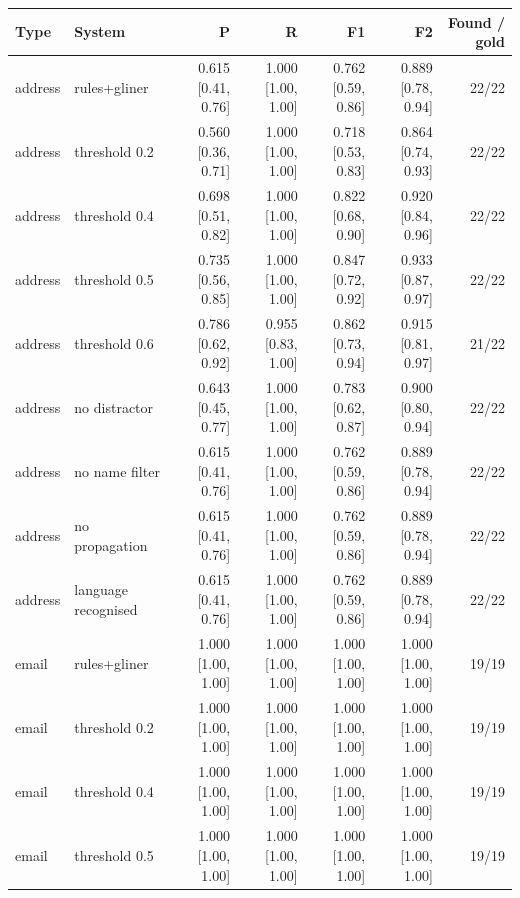 \providecommand{\ci}[2]{{\scriptsize [#1, #2]}}

\begin{table}[htbp]
\centering
\small
\begin{tabular}{llrrrrr}
\toprule
Type & System & P & R & F1 & F2 & Found / gold \\
\midrule
address & rules+gliner & 0.615 \ci{0.41}{0.76} & 1.000 \ci{1.00}{1.00} & 0.762 \ci{0.59}{0.86} & 0.889 \ci{0.78}{0.94} & 22/22 \\
address & threshold 0.2 & 0.560 \ci{0.36}{0.71} & 1.000 \ci{1.00}{1.00} & 0.718 \ci{0.53}{0.83} & 0.864 \ci{0.74}{0.93} & 22/22 \\
address & threshold 0.4 & 0.698 \ci{0.51}{0.82} & 1.000 \ci{1.00}{1.00} & 0.822 \ci{0.68}{0.90} & 0.920 \ci{0.84}{0.96} & 22/22 \\
address & threshold 0.5 & 0.735 \ci{0.56}{0.85} & 1.000 \ci{1.00}{1.00} & 0.847 \ci{0.72}{0.92} & 0.933 \ci{0.87}{0.97} & 22/22 \\
address & threshold 0.6 & 0.786 \ci{0.62}{0.92} & 0.955 \ci{0.83}{1.00} & 0.862 \ci{0.73}{0.94} & 0.915 \ci{0.81}{0.97} & 21/22 \\
address & no distractor & 0.643 \ci{0.45}{0.77} & 1.000 \ci{1.00}{1.00} & 0.783 \ci{0.62}{0.87} & 0.900 \ci{0.80}{0.94} & 22/22 \\
address & no name filter & 0.615 \ci{0.41}{0.76} & 1.000 \ci{1.00}{1.00} & 0.762 \ci{0.59}{0.86} & 0.889 \ci{0.78}{0.94} & 22/22 \\
address & no propagation & 0.615 \ci{0.41}{0.76} & 1.000 \ci{1.00}{1.00} & 0.762 \ci{0.59}{0.86} & 0.889 \ci{0.78}{0.94} & 22/22 \\
address & language recognised & 0.615 \ci{0.41}{0.76} & 1.000 \ci{1.00}{1.00} & 0.762 \ci{0.59}{0.86} & 0.889 \ci{0.78}{0.94} & 22/22 \\
email & rules+gliner & 1.000 \ci{1.00}{1.00} & 1.000 \ci{1.00}{1.00} & 1.000 \ci{1.00}{1.00} & 1.000 \ci{1.00}{1.00} & 19/19 \\
email & threshold 0.2 & 1.000 \ci{1.00}{1.00} & 1.000 \ci{1.00}{1.00} & 1.000 \ci{1.00}{1.00} & 1.000 \ci{1.00}{1.00} & 19/19 \\
email & threshold 0.4 & 1.000 \ci{1.00}{1.00} & 1.000 \ci{1.00}{1.00} & 1.000 \ci{1.00}{1.00} & 1.000 \ci{1.00}{1.00} & 19/19 \\
email & threshold 0.5 & 1.000 \ci{1.00}{1.00} & 1.000 \ci{1.00}{1.00} & 1.000 \ci{1.00}{1.00} & 1.000 \ci{1.00}{1.00} & 19/19 \\

\end{tabular}
\end{table}

